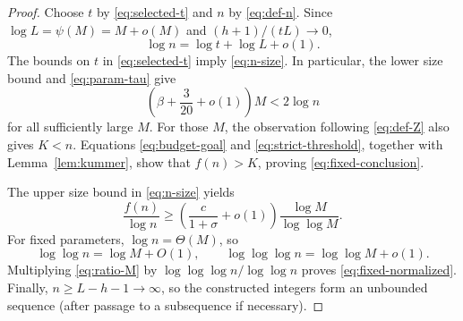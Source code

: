 \documentclass[11pt]{article}
\theoremstyle{remark}
\begin{document}
\begin{proof}
Choose \(t\) by \eqref{eq:selected-t} and \(n\) by
\eqref{eq:def-n}.  Since \(\log L=\psi(M)=M+o(M)\) and
\((h+1)/(tL)\to0\),
\begin{equation}\label{eq:log-n-exact}
 \log n=\log t+\log L+o(1).
\end{equation}
The bounds on \(t\) in \eqref{eq:selected-t} imply
\eqref{eq:n-size}.  In particular, the lower size bound and
\eqref{eq:param-tau} give
\begin{equation}\label{eq:strict-threshold}
 \left(\beta+\frac3{20}+o(1)\right)M
 <2\log n
\end{equation}
for all sufficiently large \(M\).  For those \(M\), the observation following
\eqref{eq:def-Z} also gives \(K<n\).  Equations
\eqref{eq:budget-goal} and \eqref{eq:strict-threshold}, together with
Lemma~\ref{lem:kummer}, show that \(f(n)>K\), proving
\eqref{eq:fixed-conclusion}.

The upper size bound in \eqref{eq:n-size} yields
\begin{equation}\label{eq:ratio-M}
 \frac{f(n)}{\log n}
 \geq
 \left(\frac{c}{1+\sigma}+o(1)\right)
 \frac{\log M}{\log\log M}.
\end{equation}
For fixed parameters, \(\log n=\Theta(M)\), so
\begin{equation}\label{eq:iterated-log-conversion}
 \log\log n=\log M+O(1),
 \qquad
 \log\log\log n=\log\log M+o(1).
\end{equation}
Multiplying \eqref{eq:ratio-M} by
\(\log\log\log n/\log\log n\) proves
\eqref{eq:fixed-normalized}.  Finally,
\(n\geq L-h-1\to\infty\), so the constructed integers form an unbounded
sequence (after passage to a subsequence if necessary).
\end{proof}
\end{document}
